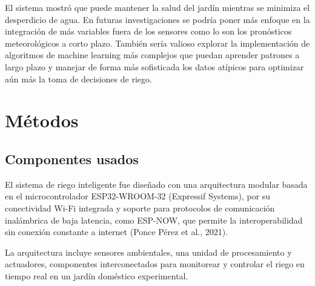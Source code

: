 \documentclass[pdflatex,sn-mathphys-num]{sn-jnl}%
\theoremstyle{thmstyleone}%
\theoremstyle{thmstyletwo}%
\theoremstyle{thmstylethree}%
\begin{document}
El sistema mostró que puede mantener la salud del jardín mientras se minimiza el desperdicio de agua. En futuras investigaciones se podría poner más enfoque en la integración de más variables fuera de los sensores como lo son los pronósticos meteorológicos a corto plazo. También sería valioso explorar la implementación de algoritmos de machine learning más complejos que puedan aprender patrones a largo plazo y manejar de forma más sofisticada los datos atípicos para optimizar aún más la toma de decisiones de riego.

\section{Métodos}

\subsection{Componentes usados}

El sistema de riego inteligente fue diseñado con una arquitectura modular basada en el microcontrolador ESP32-WROOM-32 (Expressif Systems), por su conectividad Wi-Fi integrada y soporte para protocolos de comunicación inalámbrica de baja latencia, como ESP-NOW, que permite la interoperabilidad sin conexión constante a internet (Ponce Pérez et al., 2021). 

La arquitectura incluye sensores ambientales, una unidad de procesamiento y actuadores, componentes interconectados para monitorear y controlar el riego en tiempo real en un jardín doméstico experimental.
\end{document}
